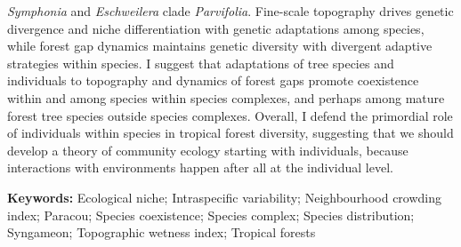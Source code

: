 {\emph{Symphonia} and \emph{Eschweilera} clade \emph{Parvifolia}. Fine-scale topography drives genetic divergence and niche differentiation with genetic adaptations among species, while forest gap dynamics maintains genetic diversity with divergent adaptive strategies within species. I suggest that adaptations of tree species and individuals to topography and dynamics of forest gaps promote coexistence within and among species within species complexes, and perhaps among mature forest tree species outside species complexes. Overall, I defend the primordial role of individuals within species in tropical forest diversity, suggesting that we should develop a theory of community ecology starting with individuals, because interactions with environments happen after all at the individual level. 

\textbf{Keywords:}
Ecological niche; Intraspecific variability; Neighbourhood crowding index; Paracou; Species coexistence; Species complex; Species distribution; Syngameon; Topographic wetness index;   Tropical forests

}
\vfill\null